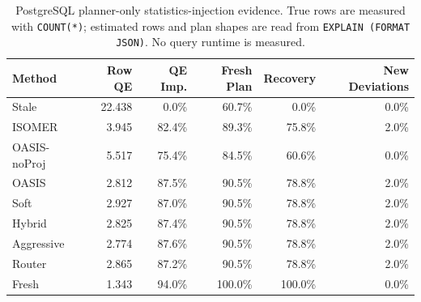 \begin{table}[t]
  \centering
  \small
  \caption{PostgreSQL planner-only statistics-injection evidence. True rows are measured with \texttt{COUNT(*)}; estimated rows and plan shapes are read from \texttt{EXPLAIN (FORMAT JSON)}. No query runtime is measured.}
  \label{tab:postgres_planner_stats_injection}
  \setlength{\tabcolsep}{4pt}
  \begin{tabular}{lrrrrr}
    \toprule
    Method & Row QE & QE Imp. & Fresh Plan & Recovery & New Deviations \\
    \midrule
    Stale & 22.438 & 0.0\% & 60.7\% & 0.0\% & 0.0\% \\
    ISOMER & 3.945 & 82.4\% & 89.3\% & 75.8\% & 2.0\% \\
    OASIS-noProj & 5.517 & 75.4\% & 84.5\% & 60.6\% & 0.0\% \\
    OASIS & 2.812 & 87.5\% & 90.5\% & 78.8\% & 2.0\% \\
    Soft & 2.927 & 87.0\% & 90.5\% & 78.8\% & 2.0\% \\
    Hybrid & 2.825 & 87.4\% & 90.5\% & 78.8\% & 2.0\% \\
    Aggressive & 2.774 & 87.6\% & 90.5\% & 78.8\% & 2.0\% \\
    Router & 2.865 & 87.2\% & 90.5\% & 78.8\% & 2.0\% \\
    Fresh & 1.343 & 94.0\% & 100.0\% & 100.0\% & 0.0\% \\
    \bottomrule
  \end{tabular}
\end{table}
